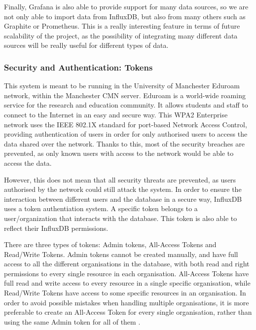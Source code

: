 \documentclass[12pt]{article}
\begin{document}
Finally, Grafana is also able to provide support for many data sources, so we are not only able to import data from InfluxDB, but also from many others such as Graphite or Prometheus. This is a really interesting feature in terms of future scalability of the project, as the possibility of integrating many different data sources will be really useful for different types of data.

\subsubsection{Security and Authentication: Tokens}

This system is meant to be running in the University of Manchester Eduroam network, within the Manchester CMN server. Eduroam is a world-wide roaming service for the research and education community. It allows students and staff to connect to the Internet in an easy and secure way. This WPA2 Enterprise network uses the IEEE 802.1X standard for port-based Network Access Control, providing authentication of users in order for only authorised users to access the data shared over the network. Thanks to this, most of the security breaches are prevented, as only known users with access to the network would be able to access the data. \par 

However, this does not mean that all security threats are prevented, as users authorised by the network could still attack the system. In order to ensure the interaction between different users and the database in a secure way, InfluxDB uses a token authentiation system. A specific token belongs to a user/organization that interacts with the database. This token is also able to reflect their InfluxDB permissions.\par

There are three types of tokens: Admin tokens, All-Access Tokens and Read/Write Tokens. Admin tokens cannot be created manually, and have full access to all the different organisations in the database, with both read and right permissions to every single resource in each organisation. All-Access Tokens have full read and write access to every resource in a single specific organisation, while Read/Write Tokens have access to some specific resources in an organisation. In order to avoid possible mistakes when handling multiple organisations, it is more preferable to create an All-Access Token for every single organisation, rather than using the same Admin token for all of them \cite{influx:tokens}.\par
\end{document}
